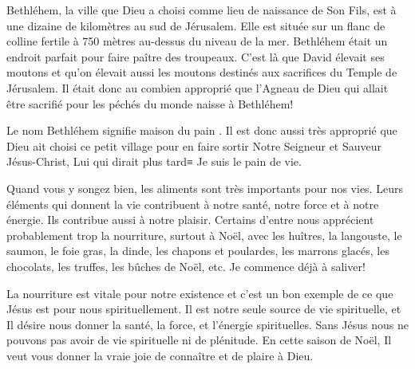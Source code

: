 


Bethléhem, la ville que Dieu a choisi comme lieu de naissance de Son Fils, est à une dizaine de kilomètres au sud de Jérusalem. Elle est située sur un flanc de colline fertile à 750 mètres au-dessus du niveau de la mer. Bethléhem était un endroit parfait pour faire paître des troupeaux. C'est là que David élevait ses moutons et qu'on élevait aussi les moutons destinés aux sacrifices du Temple de Jérusalem. Il était donc au combien approprié que l'Agneau de Dieu qui allait être sacrifié pour les péchés du monde naisse à Bethléhem!

Le nom Bethléhem signifie \og maison du pain \fg{}. Il est donc aussi très approprié que Dieu ait choisi ce petit village pour en faire sortir Notre Seigneur et Sauveur Jésus-Christ, Lui qui dirait plus tard≡ \og Je suis le pain de vie. \fg{}

Quand vous y songez bien, les aliments sont très importants pour nos vies. Leurs éléments qui donnent la vie contribuent à notre santé, notre force et à notre énergie. Ils contribue aussi à notre plaisir. Certains d'entre nous apprécient probablement trop la nourriture, surtout à Noël, avec les huîtres, la langouste, le saumon, le foie gras, la dinde, les chapons et poulardes, les marrons glacés, les chocolats, les truffes, les bûches de Noël, etc. Je commence déjà à saliver!

La nourriture est vitale pour notre existence et c'est un bon exem\-ple de ce que Jésus est pour nous spirituellement. Il est notre seule source de vie spirituelle, et Il désire nous donner la santé, la force, et l'énergie spirituelles. Sans Jésus nous ne pouvons pas avoir de vie spirituelle ni de plénitude. En cette saison de Noël, Il veut vous donner la vraie joie de connaître et de plaire à Dieu.


\ornrule


